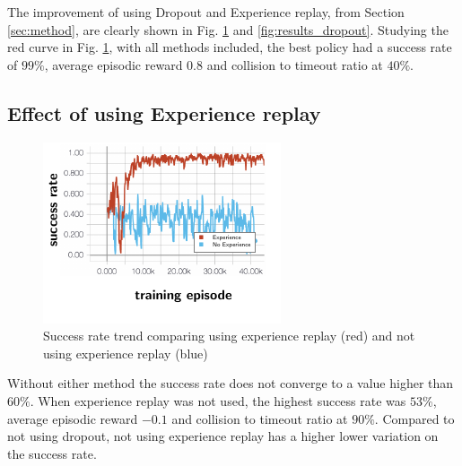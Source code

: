 The improvement of using Dropout and Experience replay, from Section \ref{sec:method}, are clearly shown in Fig. \ref{fig:results_experience} and \ref{fig:results_dropout}. Studying the red curve in Fig. \ref{fig:results_experience}, with all methods included, the best policy had a success rate of $99\%$, average episodic reward $0.8$ and collision to timeout ratio at $40\%$. 

\subsection{Effect of using Experience replay}
\begin{figure}[!ht]
	\centering
	\includegraphics[width=0.7\columnwidth]{figures/figures-experience.pdf}
	\vspace{-0.5cm}
	\caption{Success rate trend comparing using experience replay (red) and not using experience replay (blue)}
	\label{fig:results_experience}
\end{figure}
Without either method the success rate does not converge to a value higher than $60\%$. When experience replay was not used, the highest success rate was $53\%$, average episodic reward $-0.1$ and collision to timeout ratio at $90\%$. Compared to not using dropout, not using experience replay has a higher lower variation on the success rate. 

